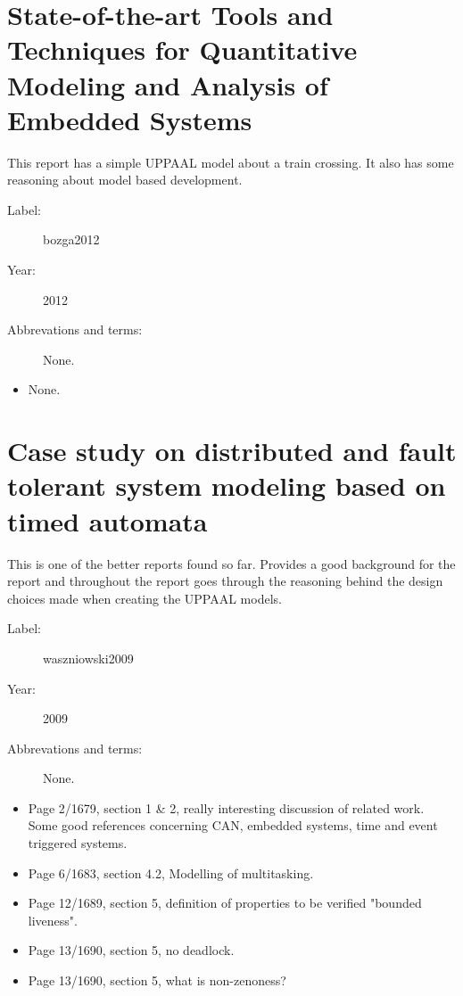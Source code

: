 \section{State-of-the-art Tools and Techniques for Quantitative Modeling and
Analysis of Embedded Systems}
This report has a simple UPPAAL model about a train crossing. It also has
some reasoning about model based development.

\begin{description}
    \item[Label:] bozga2012 \cite{bozga2012}
    \item[Year:] 2012
    \item[Abbrevations and terms:] None.
\end{description}

\begin{itemize}
    \item None.
\end{itemize}

\section{Case study on distributed and fault tolerant system modeling based on
timed automata}
This is one of the better reports found so far. Provides a good background for
the report and throughout the report goes through the reasoning behind the
design choices made when creating the UPPAAL models.

\begin{description}
    \item[Label:] waszniowski2009 \cite{waszniowski2009}
    \item[Year:] 2009
    \item[Abbrevations and terms:] None.
\end{description}

\begin{itemize}
    \item Page 2/1679, section 1 \& 2, really interesting discussion of related
        work. Some good references concerning CAN, embedded systems, time and
        event triggered systems.
    \item Page 6/1683, section 4.2, Modelling of multitasking.
    \item Page 12/1689, section 5, definition of properties to be verified
        "bounded liveness".
    \item Page 13/1690, section 5, no deadlock.
    \item Page 13/1690, section 5, what is non-zenoness?
\end{itemize}

